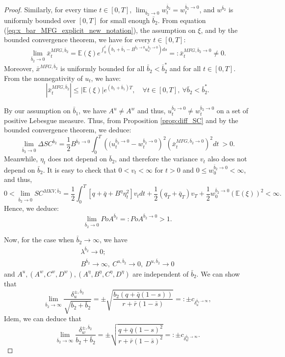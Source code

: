 \documentclass[11pt]{article}
\begin{document}
\begin{proof}
	Similarly, for every time $t\in [0,T]$, $\lim_{\bar{b}_2 \to 0}w^{\bar{b}_2}_t=w^{\bar{b}_2 \to 0}_t$, and  $w^{\bar{b}_2}$ is uniformly bounded over $[0,T]$ for small enough $\bar{b}_2$. From equation (\ref{eq:x_bar_MFG_explicit_new_notation}), the assumption on $\xi$, and by the bounded convergence theorem, we have for every $t \in [0,T]$:
   	$$\lim_{\bar{b}_2 \to 0} \bar{x}_t^{MFG,\bar{b}_2} = \mathbb{E}(\xi) e^{\int_0^t (b_1 + \bar{b}_1 - B^{\bar{b}_2 \to 0}u^{\bar{b}_2 \to 0}_s) ds} =: \bar{x}^{MFG,\bar{b}_2 \to 0}_t\neq 0.$$
	Moreover, $\bar{x}^{MFG,\bar{b}_2}$ is uniformly bounded for all $\bar{b}_2<\bar{b}^*_2$ and for all $t \in [0,T]$. From the nonnegativity of $u_t$, we have:
	$$ \left\vert \bar{x}^{MFG,\bar{b}_2}_t \right\vert \leq \left\vert \mathbb{E}(\xi) \right\vert e^{ (b_1 + \bar{b}_1 ) T }, \quad \forall t \in [0,T], \ \forall \bar{b}_2<\bar{b}^*_2. $$ 
   	
   	By our assumption on $\bar{b}_1$, we have $A^u \neq A^w$ and thus, $u^{\bar{b}_2 \to 0}_t\neq w^{\bar{b}_2 \to 0}_t$ on a set of positive Lebesgue measure. Thus, from Proposition \ref{prop:diff_SC} and by the bounded convergence theorem, we deduce:
	$$ \lim_{\bar{b}_2 \to 0} \Delta SC^{\bar{b}_2} = \frac{1}{2} B^{\bar{b}_2 \to 0} \int_0^T \left( (u_t^{\bar{b}_2 \to 0} - w_t^{\bar{b}_2 \to 0}\right)^2 \left (\bar{x}_t^{MFG,\bar{b}_2 \to 0} \right)^2 dt \  > 0. $$
	Meanwhile, $\eta_t$ does not depend on $\bar{b}_2$, and therefore the variance $v_t$ also does not depend on $\bar{b}_2$. It is easy to check that $0<v_t<\infty$ for $t>0$ and $0 \leq w^{\bar{b}_2 \to 0}_0 < \infty$, and thus,
	\begin{equation*}
	    0<\lim_{\bar{b}_2 \to 0}SC^{MKV,\bar{b}_2} = \frac{1}{2}\int_0^T \left[q+\bar{q} + B^{\eta} \eta_t^2 \right] v_t dt + \frac{1}{2}(q_T + \bar{q}_T) v_T + \frac{1}{2}w^{\bar{b}_2 \to 0}_0 (\mathbb{E}(\xi))^2<\infty.     
	\end{equation*}
	Hence, we deduce:
	$$ \lim_{\bar{b}_2 \to 0} PoA^{\bar{b}_2} =: PoA^{\bar{b}_2 \to 0} > 1. $$
	
	
	
	Now, for the case when $\bar{b}_2 \to \infty$,  we have 
	\begin{equation*}
	\begin{array}{l}
		\lambda^{\bar{b}_2} \to 0;\\
		B^{\bar{b}_2} \to \infty,\ C^{u,\bar{b}_2} \to 0,\ D^{u,\bar{b}_2} \to 0
	\end{array}
	\end{equation*}
	and $A^{u}, (A^w,C^w,D^w), (A^\eta, B^\eta, C^\eta, D^\eta)$ are independent of $\bar{b}_2$.
	We can show that 
	$$ \lim_{\bar{b}_2 \to \infty} \frac{\delta^{\pm,\bar{b}_2}_u}{\sqrt{b_2 + \bar{b}_2}} =\pm \sqrt{ \frac{b_2 (q + \bar{q}(1-s))}{r + \bar{r}(1-\bar{s})} } =: \pm c_{\delta^{\bar{b}_2 \to \infty}_u},$$
	Idem, we can deduce that 
	$$ \lim_{\bar{b}_2 \to \infty} \frac{\delta^{\pm, \bar{b}_2}_w}{b_2 + \bar{b}_2} = \pm \sqrt{\frac{q+\bar{q}(1-s)^2}{r+ \bar{r}(1-\bar{s})^2}} =: \pm c_{\delta_w^{\bar{b}_2 \to \infty}}.$$


\end{proof}
\end{document}
